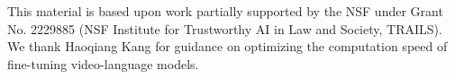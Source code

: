 This material is based upon work partially supported by the NSF under Grant No. 2229885 (NSF Institute for Trustworthy AI in Law and Society, TRAILS).
We thank Haoqiang Kang for guidance on optimizing the computation speed of fine-tuning video-language models.
